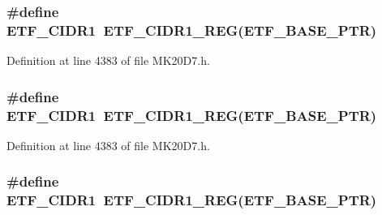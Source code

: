 \subsubsection[{\texorpdfstring{E\+T\+F\+\_\+\+C\+I\+D\+R1}{ETF_CIDR1}}]{\setlength{\rightskip}{0pt plus 5cm}\#define E\+T\+F\+\_\+\+C\+I\+D\+R1~{\bf E\+T\+F\+\_\+\+C\+I\+D\+R1\+\_\+\+R\+EG}({\bf E\+T\+F\+\_\+\+B\+A\+S\+E\+\_\+\+P\+TR})}\hypertarget{group___e_t_f___register___accessor___macros_gaf4432d41c2c9ae9498d247bbf6c738d2}{}\label{group___e_t_f___register___accessor___macros_gaf4432d41c2c9ae9498d247bbf6c738d2}


Definition at line 4383 of file M\+K20\+D7.\+h.

\subsubsection[{\texorpdfstring{E\+T\+F\+\_\+\+C\+I\+D\+R1}{ETF_CIDR1}}]{\setlength{\rightskip}{0pt plus 5cm}\#define E\+T\+F\+\_\+\+C\+I\+D\+R1~{\bf E\+T\+F\+\_\+\+C\+I\+D\+R1\+\_\+\+R\+EG}({\bf E\+T\+F\+\_\+\+B\+A\+S\+E\+\_\+\+P\+TR})}\hypertarget{group___e_t_f___register___accessor___macros_gaf4432d41c2c9ae9498d247bbf6c738d2}{}\label{group___e_t_f___register___accessor___macros_gaf4432d41c2c9ae9498d247bbf6c738d2}


Definition at line 4383 of file M\+K20\+D7.\+h.

\subsubsection[{\texorpdfstring{E\+T\+F\+\_\+\+C\+I\+D\+R1}{ETF_CIDR1}}]{\setlength{\rightskip}{0pt plus 5cm}\#define E\+T\+F\+\_\+\+C\+I\+D\+R1~{\bf E\+T\+F\+\_\+\+C\+I\+D\+R1\+\_\+\+R\+EG}({\bf E\+T\+F\+\_\+\+B\+A\+S\+E\+\_\+\+P\+TR})}\hypertarget{group___e_t_f___register___accessor___macros_gaf4432d41c2c9ae9498d247bbf6c738d2}{}\label{group___e_t_f___register___accessor___macros_gaf4432d41c2c9ae9498d247bbf6c738d2}


